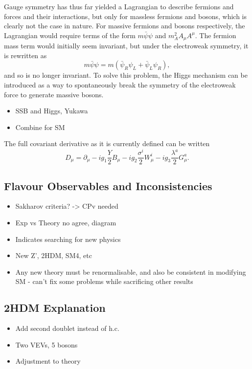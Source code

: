\documentclass[a4paper,12pt]{article}
\begin{document}
Gauge symmetry has thus far yielded a Lagrangian to describe fermions and forces and their interactions, but only for massless fermions and bosons, which is clearly not the case in nature. 
For massive fermions and bosons respectively, the Lagrangian would require terms of the form $m\bar{\psi}\psi$ and $m_A^2A_\mu A^\mu$.
The fermion mass term would initially seem invariant, but under the electroweak symmetry, it is rewritten as
\begin{equation}
    \label{eq:mass}
    m\bar{\psi}\psi = m(\bar{\psi}_R\psi_L+\bar{\psi}_L\psi_R),
\end{equation}
and so is no longer invariant.
To solve this problem, the Higgs mechanism can be introduced as a way to spontaneously break the symmetry of the electroweak force to generate massive bosons. 
\begin{itemize}
    \item SSB and Higgs, Yukawa
    \item Combine for SM
\end{itemize}
The full covariant derivative as it is currently defined can be written
\begin{equation}
    \label{eq:covar}
    D_\mu = \partial_\mu - ig_1\frac{Y}{2}B_\mu - ig_2\frac{\sigma^i}{2}W^i_\mu - ig_3\frac{\lambda^a}{2}G^a_\mu.
\end{equation}

\subsection{Flavour Observables and Inconsistencies}
\label{subsec:flavobs}
\begin{itemize}
    \item Sakharov criteria? -> CPv needed
    \item Exp vs Theory no agree, diagram
    \item Indicates searching for new physics
    \item New Z', 2HDM, SM4, etc
    \item Any new theory must be renormalisable, and also be consistent in modifying SM - can't fix some problems while sacrificing other results
\end{itemize}

\subsection{2HDM Explanation}
\begin{itemize}
    \item Add second doublet instead of h.c.
    \item Two VEVs, 5 bosons
    \item Adjustment to theory
\end{itemize}
\end{document}
